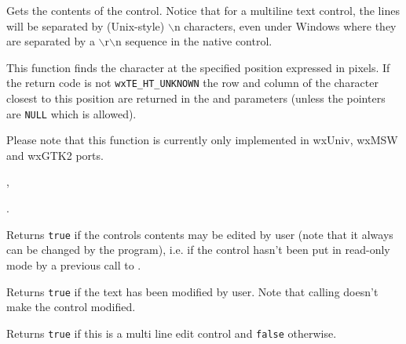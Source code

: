 Gets the contents of the control. Notice that for a multiline text control,
the lines will be separated by (Unix-style) $\backslash$n characters, even
under Windows where they are separated by a $\backslash$r$\backslash$n
sequence in the native control.


\label{wxtextctrlhittest}


This function finds the character at the specified position expressed in
pixels. If the return code is not \texttt{wxTE\_HT\_UNKNOWN} the row and column
of the character closest to this position are returned in the  and
 parameters (unless the pointers are {\tt NULL} which is allowed).

Please note that this function is currently only implemented in wxUniv,
wxMSW and wxGTK2 ports.


, 

.

\label{wxtextctrliseditable}


Returns {\tt true} if the controls contents may be edited by user (note that it
always can be changed by the program), i.e. if the control hasn't been put in
read-only mode by a previous call to
.


\label{wxtextctrlismodified}


Returns {\tt true} if the text has been modified by user. Note that calling
 doesn't make the control modified.




\label{wxtextctrlismultiline}


Returns {\tt true} if this is a multi line edit control and {\tt false}
otherwise.

